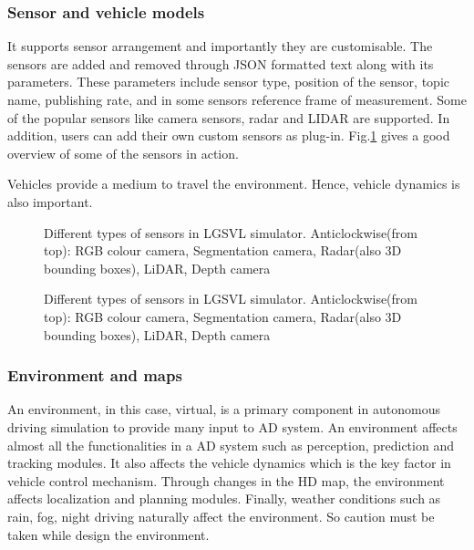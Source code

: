 \subsubsection*{Sensor and vehicle models}
It supports sensor arrangement and importantly they are customisable. The sensors are
added and removed through JSON formatted text along with its parameters. These parameters
include sensor type, position of the sensor, topic name, publishing rate, and in some
sensors reference frame of measurement. Some of the popular sensors like camera sensors,
radar and LIDAR are supported. In addition, users can add their own custom sensors as
plug-in. Fig.\ref{fig:sensortypeslgsvl} gives a good overview of some of the sensors in action.

Vehicles provide a medium to travel the environment. Hence, vehicle dynamics is also
important.

\begin{figure}[!ht]
    \centering
    \def\svgwidth{0.9\columnwidth}
    
    \caption{Different types of sensors in LGSVL simulator. Anticlockwise(from top): RGB
    colour camera, Segmentation camera, Radar(also 3D bounding boxes), LiDAR, Depth camera}
    \label{fig:sensortypeslgsvl}
\end{figure}

\begin{figure}[!ht]
    \centering
    \def\svgwidth{0.9\columnwidth}
    
    \caption{Different types of sensors in LGSVL simulator. Anticlockwise(from top): RGB
    colour camera, Segmentation camera, Radar(also 3D bounding boxes), LiDAR, Depth camera}
    \label{fig:sensortypeslgsvlnew}
\end{figure}

\subsubsection*{Environment and maps}
An environment, in this case, virtual, is a primary component in autonomous driving
simulation to provide many input to AD system. An environment affects almost all the
functionalities in a AD system such as perception, prediction and tracking modules. It
also affects the vehicle dynamics which is the key factor in vehicle control mechanism.
Through changes in the HD map, the environment affects localization and planning modules.
Finally, weather conditions such as rain, fog, night driving naturally affect the
environment. So caution must be taken while design the environment.

